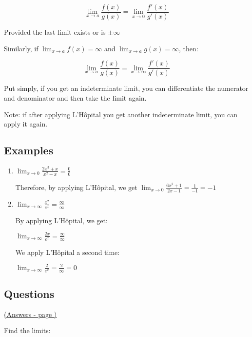 \documentclass[../main.tex]{subfiles}
\begin{document}
    \[\lim_{x \rightarrow a}\frac{f(x)}{g(x)}=\lim_{x \rightarrow 0}\frac{f'(x)}{g'(x)}\]

Provided the last limit exists or is $\pm \infty$

Similarly, if $\displaystyle \lim_{x \rightarrow a}f(x)=\infty$ and $\displaystyle \lim_{x \rightarrow a}g(x)=\infty$, then:

\[\lim_{x \rightarrow a}\frac{f(x)}{g(x)}=\lim_{x \rightarrow \infty}\frac{f'(x)}{g'(x)}\]

Put simply, if you get an indeterminate limit, you can differentiate the numerator and denominator and then take the limit again.

Note: if after applying L'H\^{o}pital you get another indeterminate limit, you can apply it again.


\subsection*{Examples}
\begin{enumerate}[itemsep=1cm]
    \item
    $\displaystyle \lim_{x\rightarrow 0}\frac{2x^3+x}{x^2-x}=\frac{0}{0}$

    Therefore, by applying L'H\^{o}pital, we get $\displaystyle \lim_{x\rightarrow 0}\frac{6x^2+1}{2x-1}=\frac{1}{-1}=-1$

    \item
    $\displaystyle \lim_{x\rightarrow \infty}\frac{x^2}{e^x}=\frac{\infty}{\infty}$

    By applying L'H\^{o}pital, we get:

    $\displaystyle \lim_{x\rightarrow \infty} \frac{2x}{e^x}=\frac{\infty}{\infty}$

    We apply L'H\^{o}pital a second time:

    $\displaystyle \lim_{x\rightarrow \infty} \frac{2}{e^x}=\frac{2}{\infty}=0$
\end{enumerate}
\pagebreak
\hypertarget{lhopitallink}{\subsection*{Questions}}
\hyperlink{lhopitalanswers}{(Answers - page {\pageref*{L'hopital answers}})}

\label{L'hopital}

Find the limits:
\end{document}
